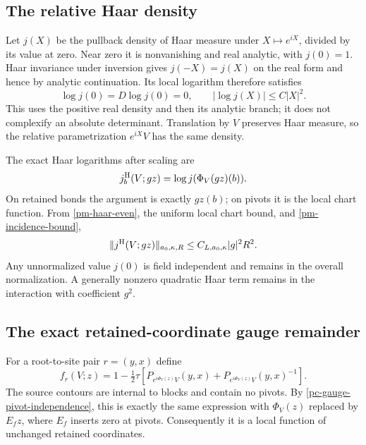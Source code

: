 \documentclass[11pt]{article}
\begin{document}
\subsection{The relative Haar density}
\label{pm-haar-section}

Let $j(X)$ be the pullback density of Haar measure under
$X\mapsto e^{iX}$, divided by its value at zero. Near zero
it is nonvanishing and real analytic, with $j(0)=1$.
Haar invariance under inversion gives $j(-X)=j(X)$ on
the real form and hence by analytic continuation. Its local
logarithm therefore satisfies
\begin{equation}\label{pm-haar-even}
 \log j(0)=D\log j(0)=0,\qquad |\log j(X)|\le C|X|^2.
\end{equation}
This uses the positive real density and then its analytic
branch; it does not complexify an absolute determinant.
Translation by $V$ preserves Haar measure, so the relative
parametrization $e^{iX}V$ has the same density.

The exact Haar logarithms after scaling are
\begin{equation}\label{pm-haar-log}
 j_b^{\rm H}(V;gz)=\log j(\Phi_V(gz)(b)).
\end{equation}
On retained bonds the argument is exactly $gz(b)$; on pivots
it is the local chart function. From
\eqref{pm-haar-even}, the uniform local chart bound, and
\eqref{pm-incidence-bound},
\begin{equation}\label{pm-haar-bound}
 \|j^{\rm H}(V;gz)\|_{a_0,\kappa,R}
 \le C_{L,a_0,\kappa}|g|^2R^2.
\end{equation}
Any unnormalized value $j(0)$ is field independent and remains
in the overall normalization. A generally nonzero quadratic
Haar term remains in the interaction with coefficient $g^2$.

\subsection{The exact retained-coordinate gauge remainder}
\label{pm-gauge-section}

For a root-to-site pair $r=(y,x)$ define
\begin{equation}\label{pm-gauge-primitive}
 f_r(V;z)=1-\tfrac12\tau\left[
 P_{e^{i\Phi_V(z)}V}(y,x)
 +P_{e^{i\Phi_V(z)}V}(y,x)^{-1}\right].
\end{equation}
The source contours are internal to blocks and contain no
pivots. By \eqref{pc-gauge-pivot-independence}, this is
exactly the same expression with $\Phi_V(z)$ replaced by
$E_fz$, where $E_f$ inserts zero at pivots. Consequently
it is a local function of unchanged retained coordinates.
\end{document}
